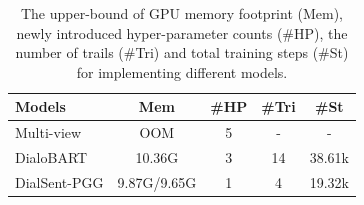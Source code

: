 \begin{table}[th]
	\small
	\centering
	\begin{tabular}{lcccc}
		\toprule[1pt]
		\textbf{Models} & \textbf{Mem} & \textbf{\#HP}& \textbf{\#Tri}&\textbf{\#St} \\
		\midrule[1pt]
		{Multi-view} &OOM &5 &- &-\\
		{DialoBART} &10.36G &3 &14 &38.61k\\
		{DialSent-PGG} &9.87G/9.65G&1 &4 & 19.32k\\
		\bottomrule[1pt]
	\end{tabular}
	\caption{The upper-bound of GPU memory footprint (Mem), newly introduced hyper-parameter counts (\#HP), the number of trails (\#Tri) and total training steps (\#St) for implementing different models.}
	\label{tab:end2endcost}
\end{table}

